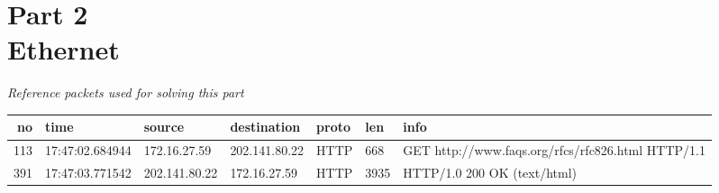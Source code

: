 \documentclass[a4,11pt]{article}
\begin{document}
\section{Part 2\\
	  Ethernet}
	 
    \textit{Reference packets used for solving this part}\\
      \begin{adjustwidth}{-2cm}{}
      \begin{tabular}{|r|l|l|l|l|l| p{4cm} |}
       \hline
       no&	time&			source&			destination&		proto&	len&	info \\
       \hline
       113& 	17:47:02.684944& 	172.16.27.59& 		202.141.80.22& 		HTTP& 	668& 	GET http://www.faqs.org/rfcs/rfc826.html HTTP/1.1 \\
       391& 	17:47:03.771542&	202.141.80.22&		172.16.27.59&		HTTP&	3935&	HTTP/1.0 200 OK  (text/html)\\
       \hline
      \end{tabular}
      \end{adjustwidth}
	  
\end{document}

